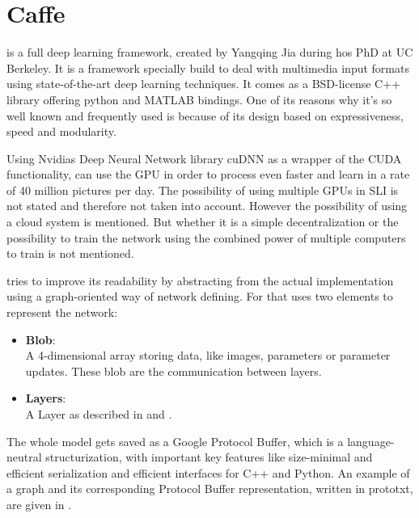 \section{Caffe} \label{sec: Caffe}


\caffe is a full deep learning framework, created by Yangqing Jia during hos PhD at UC Berkeley. It is a framework specially build to deal with multimedia input formats using state-of-the-art deep learning techniques. It comes as a BSD-license C++ library offering python and MATLAB bindings. One of its reasons why it's so well known and frequently used is because of its design based on expressiveness, speed and modularity.

Using Nvidias Deep Neural Network library cuDNN as a wrapper of the CUDA functionality, \caffe can use the GPU in order to process even faster and learn in a rate of 40 million pictures per day. The possibility of using multiple GPUs in SLI is not stated and therefore not taken into account. \cite{wiki:Caffe}
However the possibility of using a cloud system is mentioned. But whether it is a simple decentralization or the possibility to train the network using the combined power of multiple computers to train is not mentioned. \cite{jia2014caffe}

\caffe tries to improve its readability by abstracting from the actual implementation using a graph-oriented way of network defining. For that \caffe uses two elements to represent the network:
\begin{itemize}
	\item \textbf{Blob}:\\
		A 4-dimensional array storing data, like images, parameters or parameter updates. These blob are the communication between layers.
	\item \textbf{Layers}:\\
		A Layer as described in  and .
\end{itemize}
The whole model gets saved as a Google Protocol Buffer, which is a language-neutral structurization, with important key features like size-minimal and efficient serialization and efficient interfaces for C++ and Python. \cite{jia2014caffe} \cite{varda2008protocol}
An example of a graph and its corresponding Protocol Buffer representation, written in prototxt, are given in .



